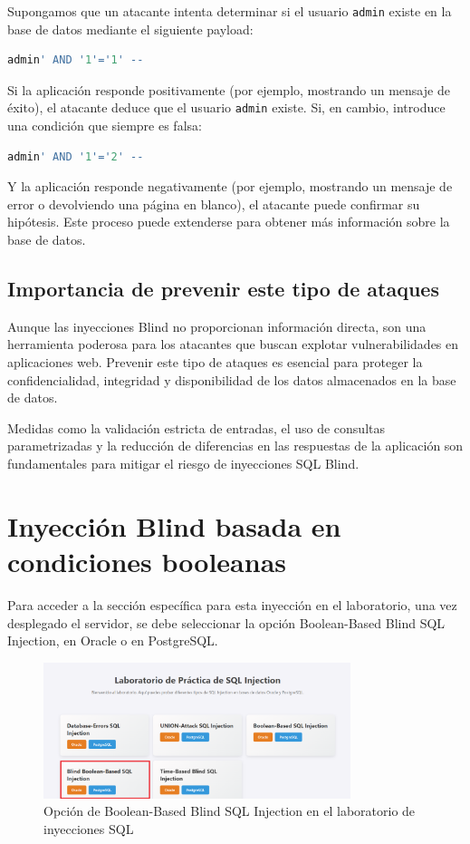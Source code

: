 \documentclass[a4paper,12pt]{article}
\begin{document}
Supongamos que un atacante intenta determinar si el usuario \texttt{admin} existe en la base de datos mediante el siguiente payload:

\begin{lstlisting}[language=SQL]
admin' AND '1'='1' --
\end{lstlisting}

Si la aplicación responde positivamente (por ejemplo, mostrando un mensaje de éxito), el atacante deduce que el usuario \texttt{admin} existe. Si, en cambio, introduce una condición que siempre es falsa:

\begin{lstlisting}[language=SQL]
admin' AND '1'='2' --
\end{lstlisting}

Y la aplicación responde negativamente (por ejemplo, mostrando un mensaje de error o devolviendo una página en blanco), el atacante puede confirmar su hipótesis. Este proceso puede extenderse para obtener más información sobre la base de datos.

\subsection{Importancia de prevenir este tipo de ataques}

Aunque las inyecciones Blind no proporcionan información directa, son una herramienta poderosa para los atacantes que buscan explotar vulnerabilidades en aplicaciones web. Prevenir este tipo de ataques es esencial para proteger la confidencialidad, integridad y disponibilidad de los datos almacenados en la base de datos.

Medidas como la validación estricta de entradas, el uso de consultas parametrizadas y la reducción de diferencias en las respuestas de la aplicación son fundamentales para mitigar el riesgo de inyecciones SQL Blind.

\section{Inyección Blind basada en condiciones booleanas}
Para acceder a la sección específica para esta inyección en el laboratorio, una vez desplegado el servidor, se debe seleccionar la opción Boolean-Based Blind SQL Injection, en Oracle o en PostgreSQL.

\begin{figure}[H]
    \centering
    \includegraphics[width=0.8\textwidth]{Imagenes/blind1.png}
    \caption{Opción de Boolean-Based Blind SQL Injection en el laboratorio de inyecciones SQL}
\end{figure}
\end{document}
